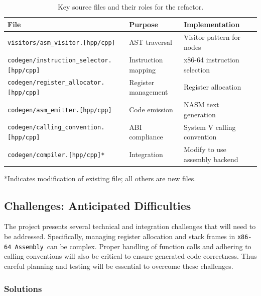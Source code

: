 \documentclass[11pt]{article}
\newcommand{\file}[1]{\texttt{#1}}
\newcommand{\asm}{\texttt{x86-64 Assembly}}
\begin{document}
\begin{table}[H]
	\centering
	\small
	\caption{Key source files and their roles for the refactor.}
	\label{tab:files}
	\begin{tabular}{@{}lll@{}}
		\toprule
		\textbf{File}                                  & \textbf{Purpose}    & \textbf{Implementation}        \\ \midrule
		\file{visitors/asm\_visitor.[hpp/cpp]}         & AST traversal       & Visitor pattern for nodes      \\
		\file{codegen/instruction\_selector.[hpp/cpp]} & Instruction mapping & x86-64 instruction selection   \\
		\file{codegen/register\_allocator.[hpp/cpp]}   & Register management & Register allocation            \\
		\file{codegen/asm\_emitter.[hpp/cpp]}          & Code emission       & NASM text generation           \\
		\file{codegen/calling\_convention.[hpp/cpp]}   & ABI compliance      & System V calling convention    \\
		\file{codegen/compiler.[hpp/cpp]*}             & Integration         & Modify to use assembly backend \\ \bottomrule
	\end{tabular}
	\vspace{0.2em}

	\scriptsize{*Indicates modification of existing file; all others are new files.}
\end{table}

\subsection{Challenges: Anticipated Difficulties}
\label{subsec:challenges}

The project presents several technical and integration challenges that will need to be addressed.
Specifically, managing register allocation and stack frames in \asm\ can be complex.
Proper handling of function calls and adhering to calling conventions will also be critical to ensure generated code correctness.
Thus careful planning and testing will be essential to overcome these challenges.

\subsubsection{Solutions}
\label{subsubsec:solutions}
\end{document}
